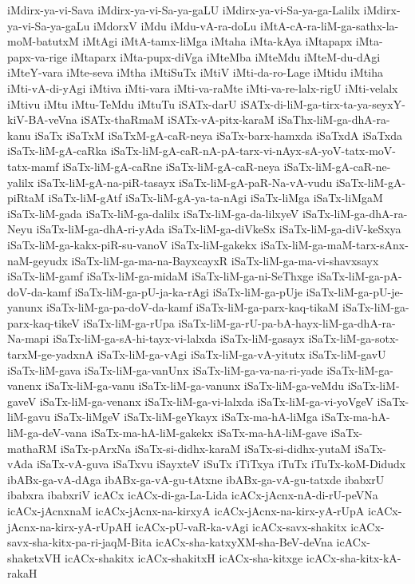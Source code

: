 {iMdirx-ya-vi-Sava
iMdirx-ya-vi-Sa-ya-gaLU
iMdirx-ya-vi-Sa-ya-ga-Lalilx
iMdirx-ya-vi-Sa-ya-gaLu
iMdorxV
iMdu
iMdu-vA-ra-doLu
iMtA-cA-ra-liM-ga-sathx-la-moM-batutxM
iMtAgi
iMtA-tamx-liMga
iMtaha
iMta-kAya
iMtapapx
iMta-papx-va-rige
iMtaparx
iMta-pupx-diVga
iMteMba
iMteMdu
iMteM-du-dAgi
iMteY-vara
iMte-seva
iMtha
iMtiSuTx
iMtiV
iMti-da-ro-Lage
iMtidu
iMtiha
iMti-vA-di-yAgi
iMtiva
iMti-vara
iMti-va-raMte
iMti-va-re-lalx-rigU
iMti-velalx
iMtivu
iMtu
iMtu-TeMdu
iMtuTu
iSATx-darU
iSATx-di-liM-ga-tirx-ta-ya-seyxY-kiV-BA-veVna
iSATx-thaRmaM
iSATx-vA-pitx-karaM
iSaThx-liM-ga-dhA-ra-kanu
iSaTx
iSaTxM
iSaTxM-gA-caR-neya
iSaTx-barx-hamxda
iSaTxdA
iSaTxda
iSaTx-liM-gA-caRka
iSaTx-liM-gA-caR-nA-pA-tarx-vi-nAyx-sA-yoV-tatx-moV-tatx-mamf
iSaTx-liM-gA-caRne
iSaTx-liM-gA-caR-neya
iSaTx-liM-gA-caR-ne-yalilx
iSaTx-liM-gA-na-piR-tasayx
iSaTx-liM-gA-paR-Na-vA-vudu
iSaTx-liM-gA-piRtaM
iSaTx-liM-gAtf
iSaTx-liM-gA-ya-ta-nAgi
iSaTx-liMga
iSaTx-liMgaM
iSaTx-liM-gada
iSaTx-liM-ga-dalilx
iSaTx-liM-ga-da-lilxyeV
iSaTx-liM-ga-dhA-ra-Neyu
iSaTx-liM-ga-dhA-ri-yAda
iSaTx-liM-ga-diVkeSx
iSaTx-liM-ga-diV-keSxya
iSaTx-liM-ga-kakx-piR-su-vanoV
iSaTx-liM-gakekx
iSaTx-liM-ga-maM-tarx-sAnx-naM-geyudx
iSaTx-liM-ga-ma-na-BayxcayxR
iSaTx-liM-ga-ma-vi-shavxsayx
iSaTx-liM-gamf
iSaTx-liM-ga-midaM
iSaTx-liM-ga-ni-SeThxge
iSaTx-liM-ga-pA-doV-da-kamf
iSaTx-liM-ga-pU-ja-ka-rAgi
iSaTx-liM-ga-pUje
iSaTx-liM-ga-pU-je-yanunx
iSaTx-liM-ga-pa-doV-da-kamf
iSaTx-liM-ga-parx-kaq-tikaM
iSaTx-liM-ga-parx-kaq-tikeV
iSaTx-liM-ga-rUpa
iSaTx-liM-ga-rU-pa-bA-hayx-liM-ga-dhA-ra-Na-mapi
iSaTx-liM-ga-sA-hi-tayx-vi-lalxda
iSaTx-liM-gasayx
iSaTx-liM-ga-sotx-tarxM-ge-yadxnA
iSaTx-liM-ga-vAgi
iSaTx-liM-ga-vA-yitutx
iSaTx-liM-gavU
iSaTx-liM-gava
iSaTx-liM-ga-vanUnx
iSaTx-liM-ga-va-na-ri-yade
iSaTx-liM-ga-vanenx
iSaTx-liM-ga-vanu
iSaTx-liM-ga-vanunx
iSaTx-liM-ga-veMdu
iSaTx-liM-gaveV
iSaTx-liM-ga-venanx
iSaTx-liM-ga-vi-lalxda
iSaTx-liM-ga-vi-yoVgeV
iSaTx-liM-gavu
iSaTx-liMgeV
iSaTx-liM-geYkayx
iSaTx-ma-hA-liMga
iSaTx-ma-hA-liM-ga-deV-vana
iSaTx-ma-hA-liM-gakekx
iSaTx-ma-hA-liM-gave
iSaTx-mathaRM
iSaTx-pArxNa
iSaTx-si-didhx-karaM
iSaTx-si-didhx-yutaM
iSaTx-vAda
iSaTx-vA-guva
iSaTxvu
iSayxteV
iSuTx
iTiTxya
iTuTx
iTuTx-koM-Didudx
ibABx-ga-vA-dAga
ibABx-ga-vA-gu-tAtxne
ibABx-ga-vA-gu-tatxde
ibabxrU
ibabxra
ibabxriV
icACx
icACx-di-ga-La-Lida
icACx-jAcnx-nA-di-rU-peVNa
icACx-jAcnxnaM
icACx-jAcnx-na-kirxyA
icACx-jAcnx-na-kirx-yA-rUpA
icACx-jAcnx-na-kirx-yA-rUpAH
icACx-pU-vaR-ka-vAgi
icACx-savx-shakitx
icACx-savx-sha-kitx-pa-ri-jaqM-Bita
icACx-sha-katxyXM-sha-BeV-deVna
icACx-shaketxVH
icACx-shakitx
icACx-shakitxH
icACx-sha-kitxge
icACx-sha-kitx-kA-rakaH
}

